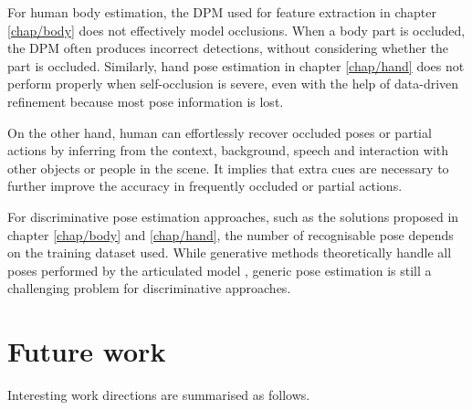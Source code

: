 For human body estimation, the DPM used for feature extraction in chapter \ref{chap/body} does not effectively model occlusions. When a body part is occluded, the DPM often produces incorrect detections, without considering whether the part is occluded. Similarly, hand pose estimation in chapter \ref{chap/hand} does not perform properly when self-occlusion is severe, even with the help of data-driven refinement because most pose information is lost. 

On the other hand, human can effortlessly recover occluded poses or partial actions by inferring from the context, \eg background, speech and interaction with other objects or people in the scene. It implies that extra cues are necessary to further improve the accuracy in frequently occluded or partial actions. 

For discriminative pose estimation approaches, such as the solutions proposed in chapter \ref{chap/body} and \ref{chap/hand}, the number of recognisable pose depends on the training dataset used. While generative methods theoretically handle all poses performed by the articulated model \cite{Oikonomidis2011}, generic pose estimation is still a challenging problem for discriminative approaches. 

\section{Future work}

Interesting work directions are summarised as follows.

